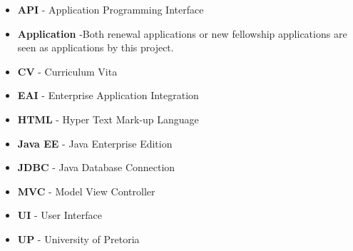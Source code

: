 \documentclass[12pt]{article}
\begin{document}
\begin{itemize}

\item \textbf{API} - Application Programming Interface
\item \textbf{Application} -Both renewal applications or new fellowship applications are seen as applications by this project.
\item \textbf{CV} - Curriculum Vita
\item \textbf{EAI} - Enterprise Application Integration
\item \textbf{HTML} - Hyper Text Mark-up Language
\item \textbf{Java EE} - Java Enterprise Edition
\item \textbf{JDBC} - Java Database Connection
\item \textbf{MVC} - Model View Controller
\item \textbf{UI} - User Interface
\item \textbf{UP} - University of Pretoria
 
\end{itemize}	
\end{document}
